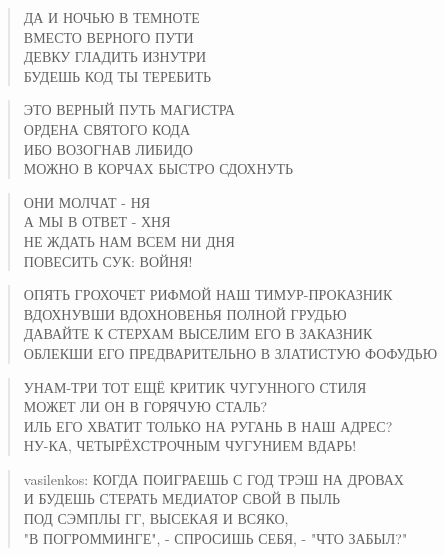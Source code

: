 \poemtitle{***}
\begin{verse}
ДА И НОЧЬЮ В ТЕМНОТЕ\\
ВМЕСТО ВЕРНОГО ПУТИ\\
ДЕВКУ ГЛАДИТЬ ИЗНУТРИ\\
БУДЕШЬ КОД ТЫ ТЕРЕБИТЬ
\end{verse}

\poemtitle{***}
\begin{verse}
ЭТО ВЕРНЫЙ ПУТЬ МАГИСТРА\\
ОРДЕНА СВЯТОГО КОДА\\
ИБО ВОЗОГНАВ ЛИБИДО\\
МОЖНО В КОРЧАХ БЫСТРО СДОХНУТЬ
\end{verse}

\poemtitle{***}
\begin{verse}
ОНИ МОЛЧАТ - НЯ\\
А МЫ В ОТВЕТ - ХНЯ\\
НЕ ЖДАТЬ НАМ ВСЕМ НИ ДНЯ\\
ПОВЕСИТЬ СУК: ВОЙНЯ!
\end{verse}

\poemtitle{***}
\begin{verse}
ОПЯТЬ ГРОХОЧЕТ РИФМОЙ НАШ ТИМУР-ПРОКАЗНИК\\
ВДОХНУВШИ ВДОХНОВЕНЬЯ ПОЛНОЙ ГРУДЬЮ \\
ДАВАЙТЕ К СТЕРХАМ ВЫСЕЛИМ ЕГО В ЗАКАЗНИК\\
ОБЛЕКШИ ЕГО ПРЕДВАРИТЕЛЬНО В ЗЛАТИСТУЮ ФОФУДЬЮ
\end{verse}

\poemtitle{***}
\begin{verse}
УНАМ-ТРИ ТОТ ЕЩЁ КРИТИК ЧУГУННОГО СТИЛЯ\\
МОЖЕТ ЛИ ОН В ГОРЯЧУЮ СТАЛЬ?\\
ИЛЬ ЕГО ХВАТИТ ТОЛЬКО НА РУГАНЬ В НАШ АДРЕС?\\
НУ-КА, ЧЕТЫРЁХСТРОЧНЫМ ЧУГУНИЕМ ВДАРЬ!
\end{verse}

\poemtitle{***}
\begin{verse}
vasilenkos: КОГДА ПОИГРАЕШЬ С ГОД ТРЭШ НА ДРОВАХ\\
И  БУДЕШЬ СТЕРАТЬ МЕДИАТОР СВОЙ В ПЫЛЬ\\
ПОД СЭМПЛЫ ГГ, ВЫСЕКАЯ И ВСЯКО,\\
"В ПОГРОММИНГЕ", - СПРОСИШЬ СЕБЯ, - "ЧТО ЗАБЫЛ?"
\end{verse}

